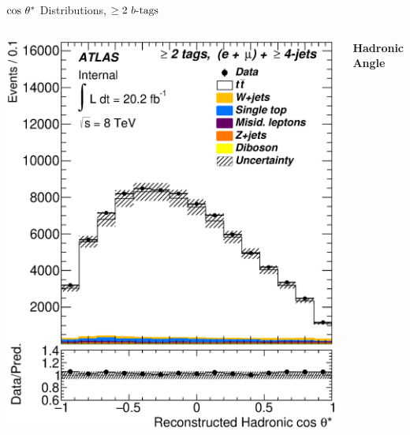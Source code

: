 \documentclass{beamer}
\begin{document}
{\begin{frame}{$\lowercase{\text{cos}}~\theta^*$ Distributions, $\geq2\text{ } \lowercase{ b\text{-tags}}$}
\begin{columns}
      \includegraphics[width=\textwidth]{../chapters/whel/figures/control_Plots2/elmu_2incl_LH48/CosTheta_reco_had_elmu}\\
      \vspace{-10pt}\begin{center}\textbf{Hadronic Angle}\end{center}
    \end{columns}
  \end{frame}

}
\end{document}
